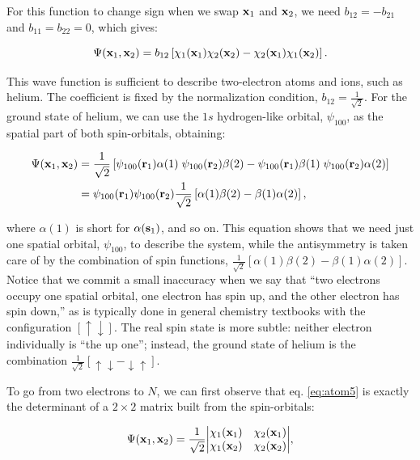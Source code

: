 \documentclass[
  english,
  9pt,
]{extbook}
\theoremstyle{definition}
\theoremstyle{definition}
\theoremstyle{definition}
\theoremstyle{definition}
\theoremstyle{remark}
\begin{document}
For this function to change sign when we swap \({\bf x}_1\) and \({\bf x}_2\), we need \(b_{12} = -b_{21}\) and \(b_{11} = b_{22} = 0\), which gives:

\begin{equation}
\Psi({\bf x}_1, {\bf x}_2) = b_{12} \left[ \chi_1({\bf x}_1) \chi_2({\bf x}_2) - \chi_2({\bf x}_1) \chi_1({\bf x}_2)\right].
\label{eq:atom5}
\end{equation}

This wave function is sufficient to describe two-electron atoms and ions, such as helium. The coefficient is fixed by the normalization condition, \(b_{12} = \frac{1}{\sqrt{2}}\). For the ground state of helium, we can use the \(1s\) hydrogen-like orbital, \(\psi_{100}\), as the spatial part of both spin-orbitals, obtaining:

\begin{equation}
\begin{aligned}
\Psi({\bf x}_1, {\bf x}_2) &= \frac{1}{\sqrt{2}} \left[ \psi_{100}({\bf r}_1)\alpha(1) \; \psi_{100}({\bf r}_2)\beta(2) - \psi_{100}({\bf r}_1)\beta(1) \; \psi_{100}({\bf r}_2)\alpha(2) \right] \\
&= \psi_{100}({\bf r}_1)\psi_{100}({\bf r}_2) \frac{1}{\sqrt{2}} \left[ \alpha(1)\beta(2) - \beta(1)\alpha(2) \right],
\end{aligned}
\label{eq:atom6}
\end{equation}

where \(\alpha(1)\) is short for \(\alpha({\bf s}_1)\), and so on. This equation shows that we need just one spatial orbital, \(\psi_{100}\), to describe the system, while the antisymmetry is taken care of by the combination of spin functions, \(\frac{1}{\sqrt{2}} \left[ \alpha(1)\beta(2) - \beta(1)\alpha(2) \right]\). Notice that we commit a small inaccuracy when we say that ``two electrons occupy one spatial orbital, one electron has spin up, and the other electron has spin down,'' as is typically done in general chemistry textbooks with the configuration \([\uparrow\downarrow]\). The real spin state is more subtle: neither electron individually is ``the up one''; instead, the ground state of helium is the combination \(\frac{1}{\sqrt{2}}\left[\uparrow\downarrow-\downarrow\uparrow\right]\).

To go from two electrons to \(N\), we can first observe that eq. \eqref{eq:atom5} is exactly the determinant of a \(2\times2\) matrix built from the spin-orbitals:

\begin{equation}
\Psi({\bf x}_1, {\bf x}_2)= \frac{1}{\sqrt{2}}{\begin{vmatrix} \chi_1({\bf x}_1)&\chi_2({\bf x}_1)\\\chi_1({\bf x}_2)&\chi_2({\bf x}_2)
\end{vmatrix}},
\label{eq:atom7}
\end{equation}
\end{document}
